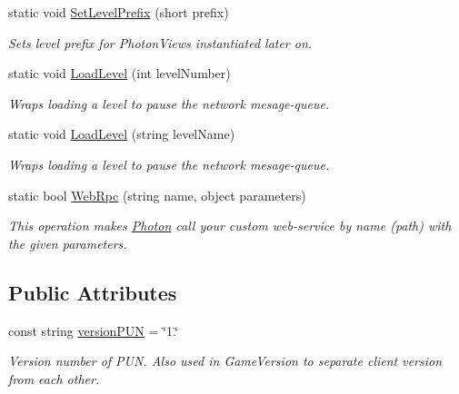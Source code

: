 \begin{DoxyCompactItemize}
static void \hyperlink{class_photon_network_a6b98294843798e6ebac72704a867b6da}{Set\+Level\+Prefix} (short prefix)
\begin{DoxyCompactList}\small\item\em Sets level prefix for Photon\+Views instantiated later on. \end{DoxyCompactList}\item 
static void \hyperlink{class_photon_network_a5bb203a37b6db717583ea7b81fb56852}{Load\+Level} (int level\+Number)
\begin{DoxyCompactList}\small\item\em Wraps loading a level to pause the network mesage-\/queue. \end{DoxyCompactList}\item 
static void \hyperlink{class_photon_network_aaa7a2114de2a80a0a2ded65d1c0079ba}{Load\+Level} (string level\+Name)
\begin{DoxyCompactList}\small\item\em Wraps loading a level to pause the network mesage-\/queue. \end{DoxyCompactList}\item 
static bool \hyperlink{class_photon_network_ad9a866c73b3e417d55266ed548a52cb8}{Web\+Rpc} (string name, object parameters)
\begin{DoxyCompactList}\small\item\em This operation makes \hyperlink{namespace_photon}{Photon} call your custom web-\/service by name (path) with the given parameters. \end{DoxyCompactList}\end{DoxyCompactItemize}
\subsection*{Public Attributes}
\begin{DoxyCompactItemize}
\item 
const string \hyperlink{class_photon_network_ac6b98cecd29a9ced8ec4a6ae78908dfc}{version\+P\+UN} = \char`\"{}1.\char`\"{}
\begin{DoxyCompactList}\small\item\em Version number of P\+UN. Also used in Game\+Version to separate client version from each other.\end{DoxyCompactList}\end{DoxyCompactItemize}
